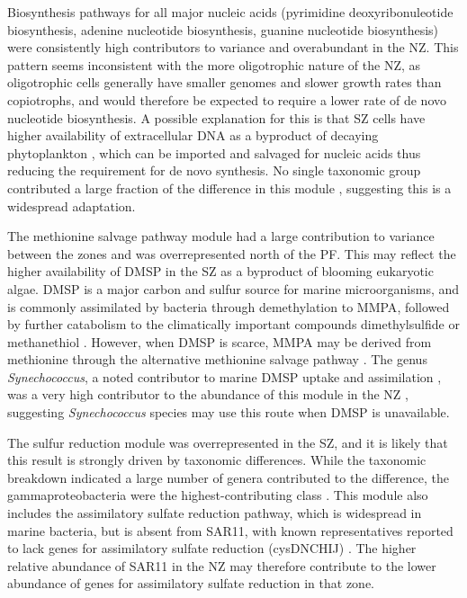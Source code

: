 Biosynthesis pathways for all major nucleic acids (pyrimidine deoxyribonuleotide biosynthesis, adenine nucleotide biosynthesis, guanine nucleotide biosynthesis) were consistently high contributors to variance and overabundant in the \ac{NZ}.
This pattern seems inconsistent with the more oligotrophic nature of the \ac{NZ}, as oligotrophic cells generally have smaller genomes \cite{Lauro:2009gx} and slower growth rates than copiotrophs, and would therefore be expected to require a lower rate of de novo nucleotide biosynthesis.
A possible explanation for this is that \ac{SZ} cells have higher availability of extracellular DNA as a byproduct of decaying phytoplankton \cite{Lomas:2011bp}, which can be imported and salvaged for nucleic acids \cite{Paul:1988wn} thus reducing the requirement for de novo synthesis.
No single taxonomic group contributed a large fraction of the difference in this module , suggesting this is a widespread adaptation.

The methionine salvage pathway module had a large contribution to variance between the zones and was overrepresented north of the \ac{PF}.
This may reflect the higher availability of \ac{DMSP} in the \ac{SZ} as a byproduct of blooming eukaryotic algae.
\ac{DMSP} is a major carbon and sulfur source for marine microorganisms, and is commonly assimilated by bacteria through demethylation to \ac{MMPA}, followed by further catabolism to the climatically important compounds dimethylsulfide or methanethiol \citep[review in][]{Curson:2011ic}.
However, when \ac{DMSP} is scarce, \ac{MMPA} may be derived from methionine through the alternative methionine salvage pathway \cite{Reisch:2012bb}.
The genus \emph{Synechococcus}, a noted contributor to marine \ac{DMSP} uptake and assimilation \cite{VilaCosta:2006gt}, was a very high contributor to the abundance of this module in the \ac{NZ} , suggesting \emph{Synechococcus} species may use this route when \ac{DMSP} is unavailable.

The sulfur reduction module was overrepresented in the \ac{SZ}, and it is likely that this result is strongly driven by taxonomic differences.
While the taxonomic breakdown indicated a large number of genera contributed to the difference, the gammaproteobacteria were the highest-contributing class .
This module also includes the assimilatory sulfate reduction pathway, which is widespread in marine bacteria, but is absent from SAR11, with known representatives reported to lack genes for assimilatory sulfate reduction (cysDNCHIJ) \cite{Tripp:2008dd}.
The higher relative abundance of SAR11 in the \ac{NZ} may therefore contribute to the lower abundance of genes for assimilatory sulfate reduction in that zone. 

